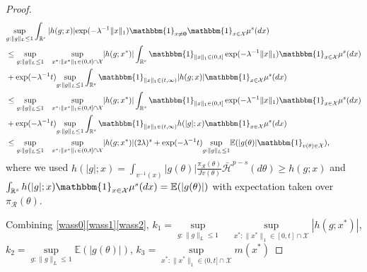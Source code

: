 \documentclass[10pt,fleqn]{article}
\newcommand{\bb}[1]{\mathbb{#1}}
\newcommand{\mc}[1]{\mathcal{#1}}
\DeclareMathOperator{\1}{\mathbbm{1}}
\begin{document}
\begin{proof}[Proof]
\begin{equation}
\label{wass2}
\begin{aligned}
& \underset{g:\|g\|_L\le 1}\sup\int_{\mathbb{R}^{s}} |h(g; x)|   { \exp(- \lambda^{-1} \| x\|_1)}   
\mathbbm{1}_{x \neq \bf 0} \mathbbm{1}_{x\in
\mathcal X}\mu^{s}(d x) \\
&\le \underset{g:\|g\|_L\le 1} \sup\quad \underset{x^{*}:\|x^{*}\|_1\in(0,t]\cap
\mathcal X}\sup |h(g; x^{*})|     
\int_{\mathbb{R}^{s}}\mathbbm{1}_{\|x\|_1\in(0,t]}\exp(- \lambda^{-1} \| x \|_1)\mathbbm{1}_{x\in
\mathcal X}\mu^{s}(d x) \\ & + \exp(- \lambda^{-1} t ) \underset{g:\|g\|_L\le 1}\sup \int_{\mathbb{R}^{s}}   \mathbbm{1}_{\|x\|_1\in(t,\infty)}|h(g; x)| \mathbbm{1}_{x\in
\mathcal X}\mu^{s}(d x) \\
&\le \underset{g:\|g\|_L\le 1}\sup \quad \underset{x^{*}:\|x^{*}\|_1\in(0,t]\cap
\mathcal X}\sup |h(g; x^{*})|     
\int_{\mathbb{R}^{s}}\mathbbm{1}_{\|x\|_1\in(0,t]}\exp(- \lambda^{-1} \| x \|_1) \mathbbm{1}_{x\in
\mathcal X}\mu^{s}(d x) \\ & + \exp(- \lambda^{-1} t ) \underset{g:\|g\|_L\le 1}\sup \int_{\mathbb{R}^{s}}   \mathbbm{1}_{\|x\|_1\in(t,\infty)}h(|g|; x) \mathbbm{1}_{x\in
\mathcal X}\mu^{s}(d x) \\
&\le \underset{g:\|g\|_L\le 1}\sup \quad\underset{x^{*}:\|x^{*}\|_1\in(0,t]\cap
\mathcal X}\sup|h(g; x^{*})|(2\lambda)^s + \exp(- \lambda^{-1} t ) \underset{g:\|g\|_L\le 1} \sup \mathbb{E}( | g(\theta )| \mathbbm{1}_{v(\theta)\in
\mathcal X}), \\
\end{aligned}
\end{equation}
where we used $h(|g|;x)=\int_{v^{-1}(x) } |g(\theta)|\frac{\pi_{\mc R}(\theta)}{Jv(\theta)}  \bar{\mc H}^{p-s}(d \theta) \ge h(g;x)$ and $ \int_{\mathbb{R}^{s}}   h(|g|; x) \mathbbm{1}_{x\in
\mathcal X}\mu^{s}(d x) = \bb E(|g(\theta)|) $  with expectation taken over $\pi_{\mc R}(\theta)$.


Combining \eqref{wass0}\eqref{wass1}\eqref{wass2}, $k_1= \underset{g:\|g\|_L\le 1}\sup \quad \underset{x^{*}:\|x^{*}\|_1\in[0,t]\cap
\mathcal X}\sup |h(g; x^*)|$, $k_2=\underset{g:\|g\|_L\le 1} \sup \mathbb{E}(| g(\theta )| )$, $k_3= \underset{x^{*}:\|x^{*}\|_1\in(0,t]\cap
\mathcal X}\sup m(x^{*})$



\end{proof}
\end{document}
